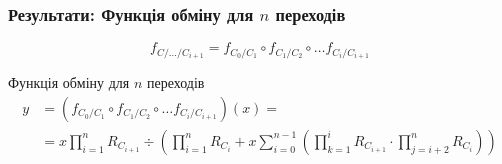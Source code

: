 \documentclass{beamer}
\begin{document}
\begin{frame}\frametitle{Результати: Функція обміну для $n$ переходів}
	\begin{equation*}
		f_{C/\ldots/C_{i+1}} = f_{C_{0}/C_{1}} \circ f_{C_{1}/C_{2}} \circ \ldots f_{C_{i}/C_{i+1}}
	\end{equation*}
	\pause{}
	\begin{block}{Функція обміну для $n$ переходів}
		\begin{equation*}
			\begin{aligned}
				y & = (f_{C_{0}/C_{1}} \circ f_{C_{1}/C_{2}} \circ \ldots f_{C_{i}/C_{i+1}})(x) =                                                                                                \\
				  & = x \prod_{i=1}^n R_{C_{i+1}} \div \left( \prod_{i=1}^{n} R_{C_{i}} + x \sum_{i=0}^{n-1} \left( \prod_{k=1}^i R_{C_{i+1}} \cdot \prod_{j=i+2}^{n}  R_{C_{i}} \right) \right)
			\end{aligned}
		\end{equation*}
	\end{block}
\end{frame}
\end{document}
